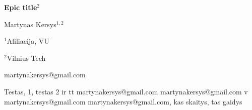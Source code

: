 \documentclass[12pt, twoside, a4paper, hidelinks]{article}
\begin{document}
    \begin{center} {\large \textbf{Epic title$^{2}$}} \end{center}
    \begin{center} Martynas Kersys$^{1,2}$ \end{center}

    \begin{center} $^{1}$Afiliacija, VU
        
        $^{2}$Vilnius Tech
        
        martynakersys@gmail.com
    \end{center}

    Testas, 1, testas 2 ir tt
martynakersys@gmail.com
martynakersys@gmail.com
v
martynakersys@gmail.com
martynakersys@gmail.com, kas skaitys, tas gaidys\setcounter{footnote}{1} 
        
    
\end{document}
